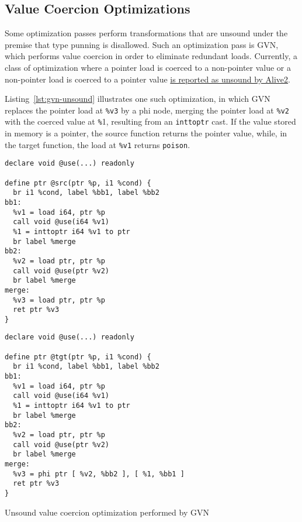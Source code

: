 \documentclass[a4paper,12pt]{article}
\begin{document}
\subsection{Value Coercion Optimizations}

Some optimization passes perform transformations that are unsound under the premise that type punning is disallowed.
Such an optimization pass is GVN, which performs value coercion in order to eliminate redundant loads.
Currently, a class of optimization where a pointer load is coerced to a non-pointer value or a non-pointer load is coerced to a pointer value \href{https://github.com/llvm/llvm-project/issues/124461}{is reported as unsound by Alive2}.

Listing~\ref{lst:gvn-unsound} illustrates one such optimization, in which GVN replaces the pointer load at \texttt{\%v3} by a phi node, merging the pointer load at \texttt{\%v2} with the coerced value at \texttt{\%}1, resulting from an \texttt{inttoptr} cast.
If the value stored in memory is a pointer, the source function returns the pointer value, while, in the target function, the load at \texttt{\%v1} returns \texttt{poison}.

\begin{listing}[h]
  \begin{minipage}{0.48\textwidth}
    \begin{verbatim}
declare void @use(...) readonly

define ptr @src(ptr %p, i1 %cond) {
  br i1 %cond, label %bb1, label %bb2
bb1:
  %v1 = load i64, ptr %p
  call void @use(i64 %v1)
  %1 = inttoptr i64 %v1 to ptr
  br label %merge
bb2:
  %v2 = load ptr, ptr %p
  call void @use(ptr %v2)
  br label %merge
merge:
  %v3 = load ptr, ptr %p
  ret ptr %v3
}
    \end{verbatim}
  \end{minipage}
  \begin{minipage}{0.45\textwidth}
    \begin{verbatim}
declare void @use(...) readonly

define ptr @tgt(ptr %p, i1 %cond) {
  br i1 %cond, label %bb1, label %bb2
bb1:
  %v1 = load i64, ptr %p
  call void @use(i64 %v1)
  %1 = inttoptr i64 %v1 to ptr
  br label %merge
bb2:
  %v2 = load ptr, ptr %p
  call void @use(ptr %v2)
  br label %merge
merge:
  %v3 = phi ptr [ %v2, %bb2 ], [ %1, %bb1 ]
  ret ptr %v3
}
    \end{verbatim}
  \end{minipage}
  \caption{Unsound value coercion optimization performed by GVN}
  \label{lst:gvn-unsound}
\end{listing}
\end{document}

